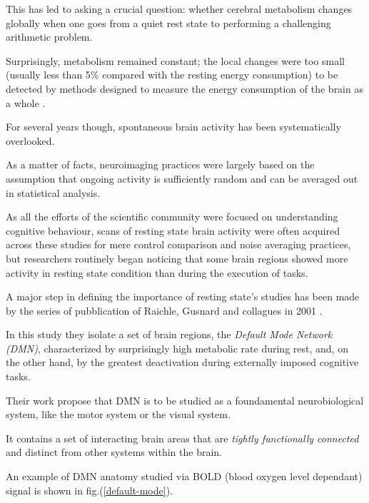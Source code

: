 \documentclass[12pt,openright,twoside,a4paper]{book}
\begin{document}
This has led to asking a crucial question: whether cerebral metabolism changes globally when one goes from a quiet rest state to performing a challenging arithmetic problem. 

Surprisingly, metabolism remained constant; the local changes were too small (usually less than 5\% compared with the resting energy consumption) to be detected by methods designed to measure the energy consumption of the brain as a whole \cite{Neuro-Hist}.

For several years though, spontaneous brain activity has been systematically overlooked.

As a matter of facts, neuroimaging practices were largely based on the assumption that ongoing activity is sufficiently random and can be averaged out in statistical analysis.

As all the efforts of the scientific community were focused on understanding cognitive behaviour, scans of resting state brain activity were often acquired across these studies for mere control comparison and noise averaging practices, but researchers routinely began noticing that some brain regions showed more activity in resting state condition than during the execution of tasks.
\vspace{5mm}

A major step in defining the importance of resting state's studies has been made by the series of pubblication of Raichle, Gusnard and collagues in 2001 \cite{default-mode}.

In this study they isolate a set of brain regions, the \textit{Default Mode Network (DMN)}, characterized by surprisingly high metabolic rate during rest, and, on the other hand, by the greatest deactivation during externally imposed cognitive tasks. 

Their work propose that DMN is to be studied as a foundamental neurobiological system, like the motor system or the visual system.

It contains a set of interacting brain areas that are \textit{tightly functionally connected} and distinct from other systems within the brain.

An example of DMN anatomy studied via BOLD ({blood oxygen level dependant}) signal is shown in fig.(\ref{default-mode}).
\end{document}
